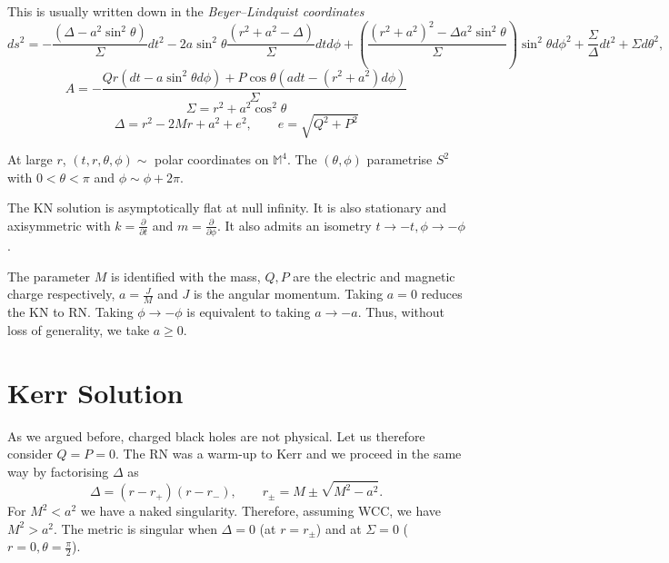 This is usually written down in the \emph{Beyer--Lindquist coordinates}
\begin{equation}
  ds^2 = -\frac{(\Delta - a^2 \sin^2 \theta)}{\Sigma} d t^2 - 2 a \sin^2 \theta \frac{(r^2+ a^2 - \Delta)}{\Sigma} dt d\phi
  + \left( \frac{(r^2 + a^2)^2 - \Delta a^2 \sin^2 \theta}{\Sigma} \right) \sin^2 \theta d\phi^2
  + \frac{\Sigma}{\Delta} dt^2 + \Sigma d\theta^2,
\end{equation}
\begin{equation}
  A = -\frac{Qr (dt - a \sin^2 \theta d\phi) + P \cos \theta (a dt - (r^2 + a^2) d\phi)}{\Sigma}
\end{equation}
\begin{equation}
  \Sigma = r^2 + a^2 \cos ^2 \theta
\end{equation}
\begin{equation}
  \Delta = r^2 - 2 M r + a^2 + e^2, \qquad e = \sqrt{Q^2 + P^2}
\end{equation}

At large $r$, $(t, r, \theta, \phi) \sim$ polar coordinates on $\mathbb{M}^4$.
The $(\theta, \phi)$ parametrise $S^2$ with $0 < \theta < \pi$ and $\phi \sim \phi + 2 \pi$.

The KN solution is asymptotically flat at null infinity.
It is also stationary and axisymmetric with $k = \frac{\partial }{\partial t}$ and $m = \frac{\partial }{\partial \phi}$.
It also admits an isometry $t \to - t, \phi \to - \phi$.

The parameter $M$ is identified with the mass, $Q, P$ are the electric and magnetic charge respectively, $a = \frac{J}{M}$ and $J$ is the angular momentum.
Taking $a =0$ reduces the KN to RN.
Taking $\phi \to - \phi$ is equivalent to taking $a \to -a$. Thus, without loss of generality, we take $a \geq 0$.

\section{Kerr Solution}%
\label{sec:kerr_solution}

As we argued before, charged black holes are not physical. Let us therefore consider $Q = P = 0$.
The RN was a warm-up to Kerr and we proceed in the same way by factorising $\Delta$ as
\begin{equation}
  \Delta = (r - r_+)(r - r_-), \qquad r_{\pm} = M \pm \sqrt{M^2 - a^2}.
\end{equation}
For $M^2 < a^2$ we have a naked singularity.
Therefore, assuming WCC, we have $M^2 > a^2$.
The metric is singular when $\Delta = 0$ (at $r = r_\pm$) and at $\Sigma = 0$ ($r = 0, \theta = \frac{\pi}{2}$).

